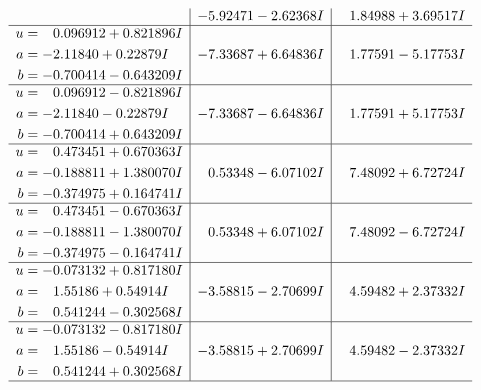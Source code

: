 \documentclass[1p]{elsarticle_modified}
\theoremstyle{definition}
\begin{document}
$$\begin{array}{c|c|c}
 & -5.92471 - 2.62368 I & \phantom{-}1.84988 + 3.69517 I \\ \hline\begin{aligned}
u &= \phantom{-}0.096912 + 0.821896 I \\
a &= -2.11840 + 0.22879 I \\
b &= -0.700414 - 0.643209 I\end{aligned}
 & -7.33687 + 6.64836 I & \phantom{-}1.77591 - 5.17753 I \\ \hline\begin{aligned}
u &= \phantom{-}0.096912 - 0.821896 I \\
a &= -2.11840 - 0.22879 I \\
b &= -0.700414 + 0.643209 I\end{aligned}
 & -7.33687 - 6.64836 I & \phantom{-}1.77591 + 5.17753 I \\ \hline\begin{aligned}
u &= \phantom{-}0.473451 + 0.670363 I \\
a &= -0.188811 + 1.380070 I \\
b &= -0.374975 + 0.164741 I\end{aligned}
 & \phantom{-}0.53348 - 6.07102 I & \phantom{-}7.48092 + 6.72724 I \\ \hline\begin{aligned}
u &= \phantom{-}0.473451 - 0.670363 I \\
a &= -0.188811 - 1.380070 I \\
b &= -0.374975 - 0.164741 I\end{aligned}
 & \phantom{-}0.53348 + 6.07102 I & \phantom{-}7.48092 - 6.72724 I \\ \hline\begin{aligned}
u &= -0.073132 + 0.817180 I \\
a &= \phantom{-}1.55186 + 0.54914 I \\
b &= \phantom{-}0.541244 - 0.302568 I\end{aligned}
 & -3.58815 - 2.70699 I & \phantom{-}4.59482 + 2.37332 I \\ \hline\begin{aligned}
u &= -0.073132 - 0.817180 I \\
a &= \phantom{-}1.55186 - 0.54914 I \\
b &= \phantom{-}0.541244 + 0.302568 I\end{aligned}
 & -3.58815 + 2.70699 I & \phantom{-}4.59482 - 2.37332 I\\
 \hline 
 \end{array}$$\newpage$$\begin{array}{c|c|c}  

\end{array}$$
\end{document}
